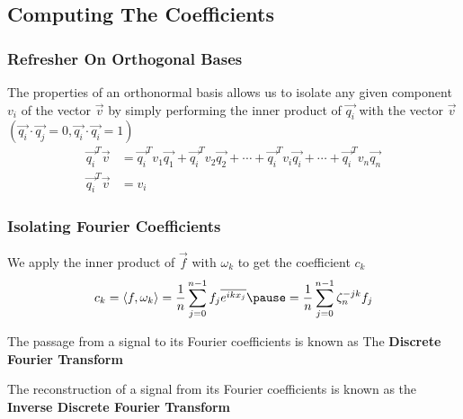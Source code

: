 \documentclass{beamer}
\begin{document}
\subsection{Computing The Coefficients}
\begin{frame}
	\frametitle{Refresher On Orthogonal Bases}
	The properties of an orthonormal basis allows us to isolate any given component $v_i$ of the vector $\vec{v}$ by simply performing the inner product of $\vec{q_i}$ with the vector $\vec{v}$
$	(\vec{q_i}\cdot \vec{q_j} = 0, \vec{q_i} \cdot \vec{q_i} = 1)$
\begin{align*}
	\vec{q_i}^T\vec{v} &= \vec{q_i}^T v_1 \vec{q_1} + \vec{q_i}^T v_2 \vec{q_2} + \cdots + \vec{q_i}^T v_i \vec{q_i} + \cdots + \vec{q_i}^T v_n \vec{q_n} \\
	\vec{q_i}^T \vec{v} &= v_i 
\end{align*}
\end{frame}
\begin{frame}
	\frametitle{Isolating Fourier Coefficients}
	We apply the inner product of $\vec{f}$ with $\omega_k$ to get the coefficient $c_k$
	\[
	c_k = \langle f, \omega_k \rangle = \frac{1}{n} \sum_{j=0}^{n-1} f_j \overline{e^{ikx_j}} \pause =  \frac{1}{n} \sum_{j=0}^{n-1} \zeta_n^{-jk} f_j
\]
\end{frame}
\begin{frame}
	\begin{definition}
The passage from a signal to its Fourier coefficients is known as The \textbf{Discrete Fourier Transform}
\end{definition}


\begin{definition}
The reconstruction of a signal from its Fourier coefficients is known as the \textbf{Inverse Discrete Fourier Transform}
\end{definition}
\end{frame}
\end{document}
